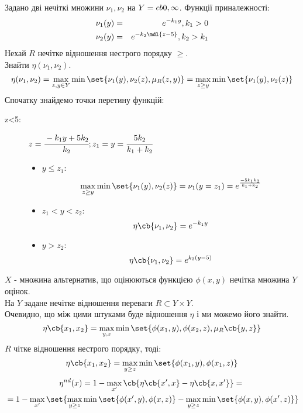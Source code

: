 \begin{exs}
Задано дві нечіткі множини $\nu_1,\nu_2$ на $Y=\\cb{0,\infty}$. Функції приналежності:
\begin{eqnarray*}
\nu_1(y) &=& e^{-k_1y},k_1>0\\
\nu_2(y) &=& e^{-k_2\mdl{z-5}},k_2>k_1
\end{eqnarray*} 
Нехай $R$ нечітке відношення нестрого порядку $\geq$.\\
Знайти $\eta(\nu_1,\nu_2)$.\\
\begin{equation*}
\eta(\nu_1,\nu_2) = \max\limits_{z,y\in Y} \min\set{\nu_1(y),\nu_2(z),\mu_R(z,y)} = \max\limits_{z\geq y} \min\set{\nu_1(y),\nu_2(z)}
\end{equation*}
Спочатку знайдемо точки перетину функцій:\\
\begin{description}
\item[z<5:] $z=\cfrac{-k_1y +5k_2}{k_2};z_1=y= \cfrac{5k_2}{k_1+k_2}$\\
\begin{itemize}
\item $y\leq z_1$:
\begin{equation*}
\max\limits_{z\geq y} \min\set{\nu_1(y),\nu_2(z)} = \nu_1(y=z_1)  = e^{\frac{-5k_1k_2}{k_1+k_2}}
\end{equation*}
\item $z_1<y<z_2$:
\begin{equation*}
\eta\cb{\nu_1,\nu_2}=e^{-k_1y}
\end{equation*}
\item $y>z_2$:
\begin{equation*}
\eta\cb{\nu_1,\nu_2}=e^{k_2(y-5)}
\end{equation*}
\end{itemize}
\end{description}
\end{exs}
$X$ - множина альтернатив, що оцінюються функцією $\phi(x,y)$ нечітка множина $Y$ оцінок.\\
На $Y$ задане нечітке відношення переваги $R\subset Y\times Y$.\\
Очевидно, що між цими штуками буде відношення $\eta$ і ми можемо його знайти.
\begin{equation}
\eta\cb{x_1,x_2} = \max\limits_{y,z}\min\set{\phi(x_1,y),\phi(x_2,z),\mu_R\cb{y,z}}
\end{equation}
$R$ чітке відношення нестрого порядку, тоді:
\begin{equation}
\eta\cb{x_1,x_2} = \max\limits_{y\geq z}\min\set{\phi(x_1,y),\phi(x_1,z)}
\end{equation}
\begin{multline}
\eta^{nd}(x) = 1 - \max\limits_{x'} \cb{\eta\cb{x',x} - \eta\cb{x,x'}} ={} \\ {} = 1 - \max\limits_{x'}\set{\max\limits_{y\geq z} \min\set{\phi(x',y),\phi(x,z)} - \max\limits_{y\geq z} \min\set{\phi(x,y),\phi(x',z)}}
\end{multline}
